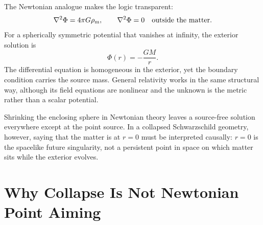 The Newtonian analogue makes the logic transparent:
\begin{equation}
  \nabla^2\Phi=4\pi G\rho_{\mathrm m},
  \qquad
  \nabla^2\Phi=0
  \quad\hbox{outside the matter}.
  \label{eq:l12-poisson}
\end{equation}
For a spherically symmetric potential that vanishes at infinity, the
exterior solution is
\begin{equation}
  \Phi(r)=-\frac{GM}{r}.
  \label{eq:l12-newton-potential}
\end{equation}
The differential equation is homogeneous in the exterior, yet the
boundary condition carries the source mass.  General relativity
works in the same structural way, although its field equations are
nonlinear and the unknown is the metric rather than a scalar
potential.

\begin{classroomqa}
\end{classroomqa}

Shrinking the enclosing sphere in Newtonian theory leaves a
source-free solution everywhere except at the point source.  In a
collapsed Schwarzschild geometry, however, saying that the matter is
at \(r=0\) must be interpreted causally: \(r=0\) is the spacelike
future singularity, not a persistent point in space on which matter
sits while the exterior evolves.

\begin{classroomqa}
\end{classroomqa}

\section{Why Collapse Is Not Newtonian Point Aiming}

